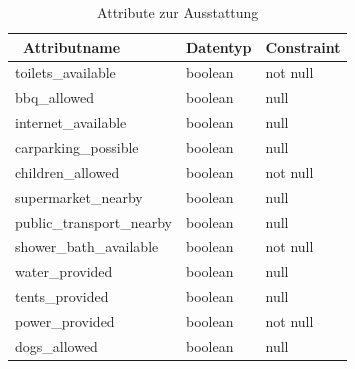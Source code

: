 \begin{table}[H]
\caption{Attribute zur Ausstattung}
\centering
\begin{tabular}{|l|l|l|}
\hline
\ \textbf{Attributname}                         						 & \textbf{Datentyp} 					  & \textbf{Constraint} 					  \\ \hline
toilets\_available                                                   & boolean                                & not null                                  \\ \hline
bbq\_allowed                                                         & boolean                                & null                                      \\ \hline
internet\_available                                                  & boolean                                & null                                      \\ \hline
carparking\_possible                                                 & boolean                                & null                                      \\ \hline
children\_allowed                                                    & boolean                                & not null                                  \\ \hline
supermarket\_nearby                                                  & boolean                                & null                                      \\ \hline
public\_transport\_nearby 	  										 & boolean                                & null                                      \\ \hline
shower\_bath\_available                                              & boolean                                & not null                                  \\ \hline
water\_provided                                                      & boolean                                & null                                      \\ \hline
tents\_provided                                                      & boolean                                & null                                      \\ \hline
power\_provided                                                      & boolean                                & not null                                  \\ \hline
dogs\_allowed                                                        & boolean                                & null                                      \\ \hline

\end{tabular}
\end{table}
